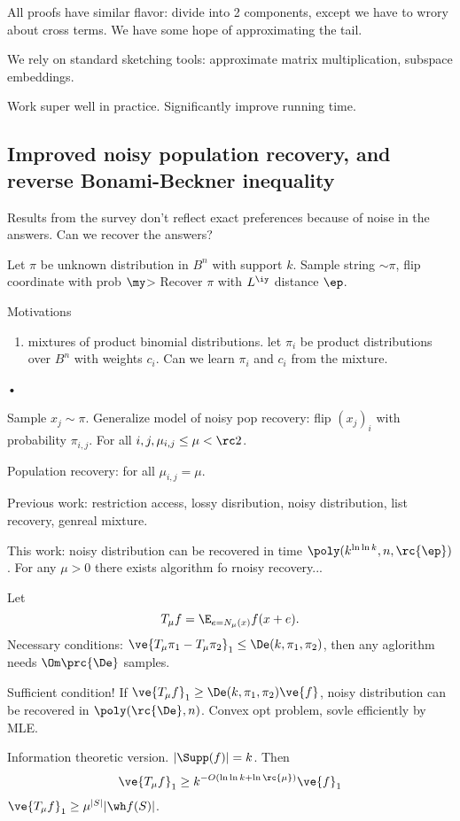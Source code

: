 All proofs have similar flavor: divide into 2 components, except we have to wrory about cross terms. 
We have some hope of approximating the tail.

We rely on standard sketching tools: approximate matrix multiplication, subspace embeddings. 

Work super well in practice. Significantly improve running time. 


\subsection{Improved noisy population recovery, and reverse Bonami-Beckner inequality}

Results from the survey don't reflect exact preferences because of noise in the answers. Can we recover the answers?

\begin{mdl}
Let $\pi$ be unknown distribution in $B^n$ with support $k$. Sample string $\sim \pi$, flip coordinate with prob $\my$> Recover $\pi$ with $L^{\iy}$ distance $\ep$.
\end{mdl}
Motivations
\begin{enumerate}
\item
mixtures of product binomial distributions. let $\pi_i$ be product distributions over $B^n$ with weights $c_i$. Can  we learn $\pi_i$ and $c_i$ from the mixture.
\end{enumerate}•

Sample $x_j\sim \pi$. Generalize model of noisy pop recovery: flip $(x_j)_i$ with probability $\pi_{i,j}$. For all $i,j, \mu_{i,j}\le \mu < \rc2$.

Population recovery: for all $\mu_{i,j}=\mu$.

Previous work: restriction access, lossy disribution, noisy distribution, list recovery, genreal mixture.

This work: noisy distribution can be recovered in time $\poly(k^{\ln\ln k},n,\rc{\ep})$. For any $\mu>0$ there exists algorithm fo rnoisy recovery...

Let 
\[T_\mu f= \E_{e=N_\mu(x)}f(x+e).\]
Necessary conditions: $\ve{T_\mu \pi_1-T_\mu \pi_2}_1\le \De(k,\pi_1,\pi_2)$, then any aglorithm needs $\Om\prc{\De}$ samples.

Sufficient condition! If $\ve{T_\mu f}_1\ge \De(k,\pi_1,\pi_2)\ve{f}$, noisy distribution can be recovered in $\poly(\rc{\De},n)$.
Convex opt problem, sovle efficiently by MLE.

Information theoretic version. $|\Supp(f)|=k$. Then
\[
\ve{T_\mu f}_1\ge k^{-O(\ln\ln k+\ln \rc{\mu})}\ve{f}_1
\]
$\ve{T_\mu f}_1\ge \mu^{|S|} |\wh f(S)|$.

